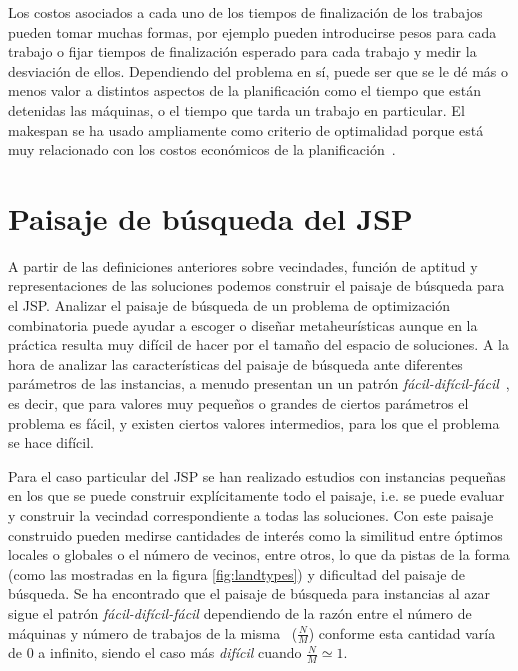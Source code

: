 Los costos asociados a cada uno de los tiempos de finalización de los trabajos pueden tomar muchas formas, por ejemplo pueden introducirse pesos para cada 
trabajo o fijar tiempos de finalización esperado para cada trabajo y medir la desviación de ellos.
%
Dependiendo del problema en sí, puede ser que se le dé más o menos valor a distintos aspectos de la planificación como el tiempo que están detenidas las máquinas, 
o el tiempo que tarda un trabajo en particular. 
%
El makespan se ha usado ampliamente como criterio de optimalidad porque está muy relacionado con los costos económicos de la planificación~\cite{Rand1977}.


\section{Paisaje de búsqueda del JSP}

A partir de las definiciones anteriores sobre vecindades, función de aptitud y representaciones de las soluciones podemos construir el paisaje de búsqueda para el JSP.
%
Analizar el paisaje de búsqueda de un problema de optimización combinatoria puede ayudar a escoger o diseñar metaheurísticas aunque en la práctica resulta muy difícil
de hacer por el tamaño del espacio de soluciones. 
%
A la hora de analizar las características del paisaje de búsqueda ante diferentes parámetros de las instancias, a menudo presentan un un patrón 
\textit{fácil-difícil-fácil}~\cite{mammen1997new}, es decir, que para valores muy pequeños o grandes de ciertos parámetros el problema es fácil, y existen ciertos valores
intermedios, para los que el problema se hace difícil.

Para el caso particular del JSP se han realizado estudios con instancias pequeñas en los que se puede construir explícitamente todo el paisaje, i.e. se puede evaluar y 
construir la vecindad correspondiente a todas las soluciones. 
%
Con este paisaje construido pueden medirse cantidades de interés como la similitud entre óptimos locales o globales o el número de vecinos, entre otros, lo que da
pistas de la forma (como las mostradas en la figura \ref{fig:landtypes}) y dificultad del paisaje de búsqueda.
%
Se ha encontrado que el paisaje de búsqueda para instancias al azar sigue el patrón \textit{fácil-difícil-fácil} dependiendo de la razón entre el número de máquinas y 
número de trabajos de la misma~\cite{Streeter2006} ($\frac{N}{M}$) conforme esta cantidad  varía de 0 a infinito, siendo el caso más \textit{difícil} cuando $\frac{N}{M}\simeq 1$. 
%

